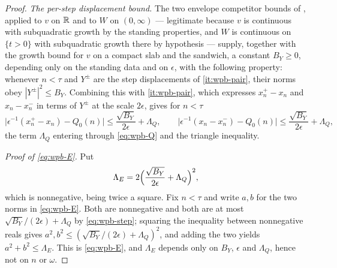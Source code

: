 \begin{proof}
\emph{The per-step displacement bound.} The two envelope competitor bounds of
, applied to $v$ on $\mathbb{R}$ and to $W$ on
$(0,\infty)$ --- legitimate because $v$ is continuous with subquadratic growth
by the standing properties, and $W$ is continuous on $\{t>0\}$ with
subquadratic growth there by hypothesis --- supply, together with the growth
bound for $v$ on a compact slab and the sandwich, a constant $B_Y\ge0$,
depending only on the standing data and on $\epsilon$, with the following
property: whenever $n<\tau$ and $Y^\pm$ are the step displacements of
\ref{it:wpb-pair}, their norms obey $|Y^\pm|^2\le B_Y$. Combining this with
\ref{it:wpb-pair}, which expresses $x^+_n-x_n$ and $x_n-x^-_n$ in terms of
$Y^\pm$ at the scale $2\epsilon$, gives for $n<\tau$
\begin{equation}\label{eq:wpb-step}
  \bigl|\epsilon^{-1}(x^+_n-x_n)-Q_0(n)\bigr|
    \le\frac{\sqrt{B_Y}}{2\epsilon}+\Lambda_Q,
  \qquad
  \bigl|\epsilon^{-1}(x_n-x^-_n)-Q_0(n)\bigr|
    \le\frac{\sqrt{B_Y}}{2\epsilon}+\Lambda_Q ,
\end{equation}
the term $\Lambda_Q$ entering through \eqref{eq:wpb-Q} and the triangle
inequality.

\emph{Proof of \eqref{eq:wpb-E}.} Put
\[
  \Lambda_E=2\Bigl(\frac{\sqrt{B_Y}}{2\epsilon}+\Lambda_Q\Bigr)^2 ,
\]
which is nonnegative, being twice a square. Fix $n<\tau$ and write $a,b$ for
the two norms in \eqref{eq:wpb-E}. Both are nonnegative and both are at most
$\sqrt{B_Y}/(2\epsilon)+\Lambda_Q$ by \eqref{eq:wpb-step}; squaring the
inequality between nonnegative reals gives
$a^2,b^2\le(\sqrt{B_Y}/(2\epsilon)+\Lambda_Q)^2$, and adding the two yields
$a^2+b^2\le\Lambda_E$. This is \eqref{eq:wpb-E}, and $\Lambda_E$ depends only
on $B_Y$, $\epsilon$ and $\Lambda_Q$, hence not on $n$ or $\omega$.
\end{proof}
